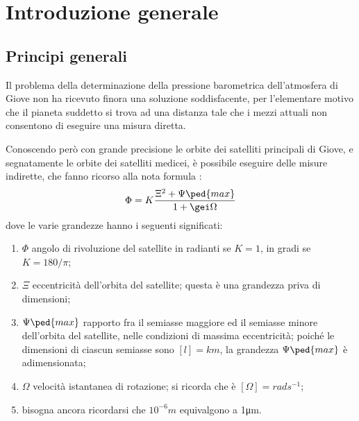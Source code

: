 \documentclass[%
,corpo=11.5pt
,twoside
,cucitura
,tipotesi=frontespizio
]{toptesi}
\begin{document}
\tablespagetrue\figurespagetrue %
\indici

%
%
%
%
\mainmatter

\chapter{Introduzione generale}

\section{Principi generali}
Il problema della determinazione della pressione barometrica dell'atmosfera di Giove non ha ricevuto finora una soluzione soddisfacente, per l'elementare motivo che il pianeta suddetto si trova ad una distanza tale che i mezzi attuali non consentono di eseguire una misura diretta.

Conoscendo per{\`o} con grande precisione le orbite dei satelliti principali di Giove, e segnatamente le orbite dei satelliti medicei, \`e possibile eseguire delle misure indirette, che fanno ricorso alla nota formula \cite{gal}:
\[
\Phi = K\frac{\Xi^2 +\Psi\ped{max}}{1+\gei\Omega}
\]
dove le varie grandezze hanno i seguenti significati:
\begin{enumerate}
\item
$\Phi$ angolo di rivoluzione del satellite in radianti se $K=1$, in gradi se
$K=180/\pi$;
\item
$\Xi$ eccentricit\`a dell'orbita del satellite; questa \`e una grandezza priva di dimensioni;
\item
$\Psi\ped{max}$ rapporto fra il semiasse maggiore ed il semiasse minore
dell'orbita del satellite, nelle condizioni di massima eccentricit{\`a};
poich{\'e} le dimensioni di ciascun semiasse sono $[l]=\unit{km}$, la grandezza
$\Psi\ped{max}$ \`e adimensionata;
\item
$\Omega$ velocit\`a istantanea di rotazione; si ricorda che \`e $[\Omega]=%
\unit{rad}\unit{s}^{-1}$;
\item bisogna ancora ricordarsi che $10^{-6}\unit{m}$ equivalgono a 1\unit{\micro m}.
\end{enumerate}
%
\end{document}

